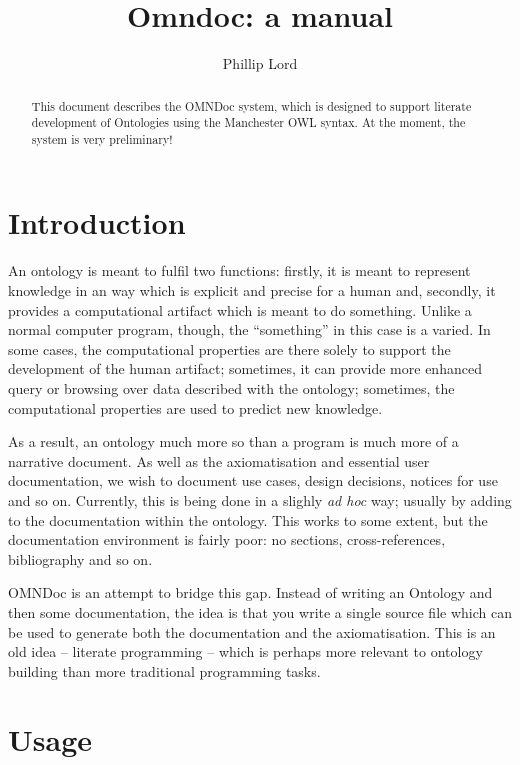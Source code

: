 \documentclass{article}
\title{Omndoc: a manual}
\author{Phillip Lord}
\begin{document}
\maketitle

\begin{abstract}
  This document describes the OMNDoc system, which is designed to support
  literate development of Ontologies using the Manchester OWL syntax. At the
  moment, the system is very preliminary!
\end{abstract}

\section{Introduction}
\label{sec:introduction}

An ontology is meant to fulfil two functions: firstly, it is meant to
represent knowledge in an way which is explicit and precise for a human and,
secondly, it provides a computational artifact which is meant to do something.
Unlike a normal computer program, though, the ``something'' in this case is a
varied. In some cases, the computational properties are there solely
to support the development of the human artifact; sometimes, it can provide
more enhanced query or browsing over data described with the ontology;
sometimes, the computational properties are used to predict new knowledge.

As a result, an ontology much more so than a program is much more of a
narrative document. As well as the axiomatisation and essential user
documentation, we wish to document use cases, design decisions, notices for
use and so on. Currently, this is being done in a slighly \textit{ad hoc} way;
usually by adding to the documentation within the ontology. This works to some
extent, but the documentation environment is fairly poor: no sections,
cross-references, bibliography and so on. 

OMNDoc is an attempt to bridge this gap. Instead of writing an Ontology and
then some documentation, the idea is that you write a single source file which
can be used to generate both the documentation and the axiomatisation. This is
an old idea -- literate programming -- which is perhaps more relevant to
ontology building than more traditional programming tasks. 

\section{Usage}
\label{sec:usage}
\end{document}
